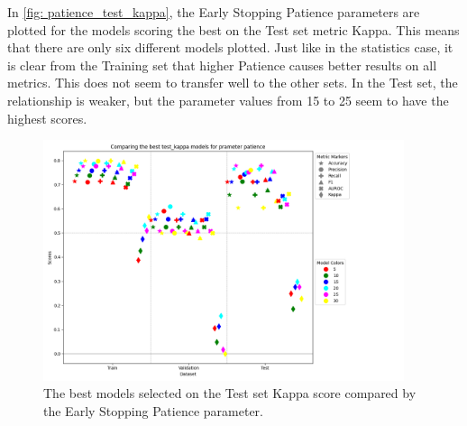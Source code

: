 In \autoref{fig: patience_test_kappa}, the Early Stopping Patience parameters are plotted for the models scoring the best on the Test set metric Kappa. This means that there are only six different models plotted. Just like in the statistics case, it is clear from the Training set that higher Patience causes better results on all metrics. This does not seem to transfer well to the other sets. In the Test set, the relationship is weaker, but the parameter values from 15 to 25 seem to have the highest scores.

\begin{figure}[H]
    \centering
    \includegraphics[width=400px]{Figures/results/patience/patience_test_kappa.png}
    \caption{The best models selected on the Test set Kappa score compared by the Early Stopping Patience parameter.}
    \label{fig: patience_test_kappa}
\end{figure}


